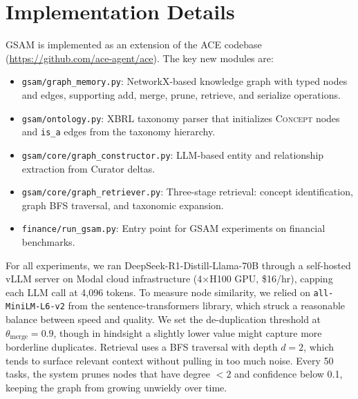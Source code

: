 \documentclass[12pt,a4paper,oneside]{article}
\begin{document}
\section{Implementation Details}
\label{app:implementation}

GSAM is implemented as an extension of the ACE codebase (\url{https://github.com/ace-agent/ace}). The key new modules are:

\begin{itemize}
\item \texttt{gsam/graph\_memory.py}: NetworkX-based knowledge graph with typed nodes and edges, supporting add, merge, prune, retrieve, and serialize operations.
\item \texttt{gsam/ontology.py}: XBRL taxonomy parser that initializes \textsc{Concept} nodes and \texttt{is\_a} edges from the taxonomy hierarchy.
\item \texttt{gsam/core/graph\_constructor.py}: LLM-based entity and relationship extraction from Curator deltas.
\item \texttt{gsam/core/graph\_retriever.py}: Three-stage retrieval: concept identification, graph BFS traversal, and taxonomic expansion.
\item \texttt{finance/run\_gsam.py}: Entry point for GSAM experiments on financial benchmarks.
\end{itemize}

For all experiments, we ran DeepSeek-R1-Distill-Llama-70B through a self-hosted vLLM server on Modal cloud infrastructure (4$\times$H100 GPU, \$16/hr), capping each LLM call at 4,096 tokens. To measure node similarity, we relied on \texttt{all-MiniLM-L6-v2} from the sentence-transformers library, which struck a reasonable balance between speed and quality. We set the de-duplication threshold at $\theta_{\text{merge}} = 0.9$, though in hindsight a slightly lower value might capture more borderline duplicates. Retrieval uses a BFS traversal with depth $d = 2$, which tends to surface relevant context without pulling in too much noise. Every 50 tasks, the system prunes nodes that have degree $< 2$ and confidence below 0.1, keeping the graph from growing unwieldy over time.
\end{document}
